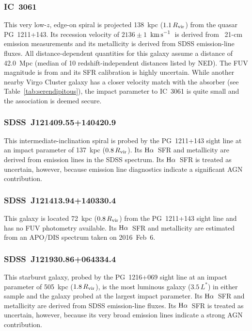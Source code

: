 \documentclass[twocolumn,twocolappendix,tighten,times]{aastex6}
\newcommand{\HI}{\ion{H}{1}}
\newcommand{\Ha}{\ensuremath{{\rm H}\alpha}}
\newcommand{\kms}{\ensuremath{{\rm km\,s}^{-1}}}
\begin{document}
\subsubsection{IC~3061}
\label{indiv:galaxies:ic3061}

This very low-$z$, edge-on spiral is projected 138~kpc ($1.1\,R_{\rm vir}$) from 
the quasar PG~1211+143. Its recession velocity of $2136\pm1$~\kms\ is derived from 
\HI\ 21-cm emission measurements \citep{springob05} and its metallicity is derived 
from SDSS emission-line fluxes. All distance-dependent quantities for this galaxy 
assume a distance of 42.0~Mpc (median of 10 redshift-independent distances listed by 
NED). The FUV magnitude is from \citet{rifatto95} and its SFR calibration is highly 
uncertain. While another nearby Virgo Cluster galaxy has a closer velocity match with 
the absorber (see Table~\ref{tab:serendipitous}), the impact parameter to IC~3061 is 
quite small and the association is deemed secure.


\subsubsection{SDSS~J121409.55+140420.9}
\label{indiv:galaxies:sdssj1214+14a}

This intermediate-inclination spiral is probed by the PG~1211+143 sight line at 
an impact parameter of 137~kpc ($0.8\,R_{\rm vir}$). Its \Ha\ SFR and 
metallicity are derived from emission lines in the SDSS spectrum.
Its \Ha\ SFR is treated as uncertain, however, because emission line diagnostics
\citep{kewley06} indicate a significant AGN contribution.


\subsubsection{SDSS~J121413.94+140330.4}
\label{indiv:galaxies:sdssj1214+14b}

This galaxy is located 72~kpc ($0.8\,R_{\rm vir}$) from the PG~1211+143 sight line
and has no FUV photometry available. Its \Ha\ SFR and metallicity are estimated
from an APO/DIS spectrum taken on 2016~Feb~6.


\subsubsection{SDSS~J121930.86+064334.4}
\label{indiv:galaxies:sdssj1219+06a}

This starburst galaxy, probed by the PG~1216+069 sight line at an impact parameter
of 505~kpc ($1.8\,R_{\rm vir}$), is the most luminous galaxy ($3.5\,L^*$) in 
either sample and the galaxy probed at the largest impact parameter. Its \Ha\ 
SFR and metallicity are derived from SDSS emission-line fluxes. Its \Ha\ SFR 
is treated as uncertain, however, because its very broad emission lines indicate 
a strong AGN contribution.
\end{document}
